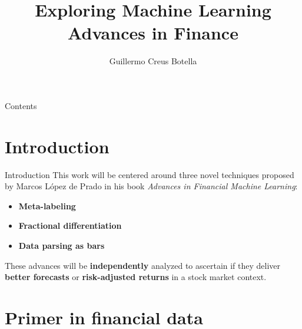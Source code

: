 \documentclass[usenames,dvipsnames]{beamer} %
\title[Exploring ML Advances in Finance]
{Exploring Machine Learning Advances in Finance}
\author[GCB]{Guillermo Creus Botella}
\date{\displaydate{date}}
\begin{document}
\begin{frame}
	\maketitle
\end{frame}

\begin{frame}{Contents}
	\tableofcontents
\end{frame}

\section{Introduction}
\frame{\tableofcontents[currentsection]}

\begin{frame}{Introduction}
This work will be centered around three novel techniques proposed by Marcos 
López de Prado in his book \textit{Advances in Financial Machine Learning}:

\begin{itemize}
	\item \textbf{Meta-labeling}
	\item \textbf{Fractional differentiation}
	\item \textbf{Data parsing as bars}
\end{itemize}

\vspace{.4cm}
These advances will be \textbf{independently} analyzed to ascertain if they 
deliver \textbf{better forecasts} or \textbf{risk-adjusted returns} in a 
stock market context.


\end{frame}

\section{Primer in financial data}
\frame{\tableofcontents[currentsection]}
\end{document}
